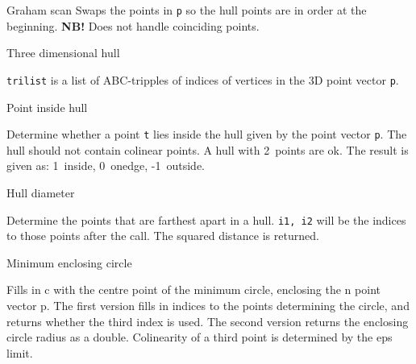 
\begin{algorithm}{Graham scan}
\desc
Swaps the points in {\tt p} so the hull points are in order at the
beginning.  {\bf NB!} Does not handle coinciding points.
\end{algorithm}


\begin{algorithm}{Three dimensional hull}


\desc
{\tt trilist} is a list of ABC-tripples of indices of vertices in the 3D
point vector {\tt p}.
\end{algorithm}


\begin{algorithm}{Point inside hull}

\desc
Determine whether a point {\tt t} lies inside the hull given by the
point vector {\tt p}. The hull should not contain colinear points. A hull with
2~points are ok. The result is given as: 1~inside, 0~onedge, -1~outside.
\end{algorithm}


\begin{algorithm}{Hull diameter}

\desc
Determine the points that are farthest apart in a hull.
{\tt i1, i2} will be the indices to those points after the call.
The squared distance is returned.
\end{algorithm}


\begin{algorithm}{Minimum enclosing circle}

\desc
Fills in c with the centre point of the minimum circle, enclosing the
n point vector p. 
The first version fills in indices to the points
determining the circle, and returns whether the third index is used.
The second version returns the enclosing circle radius as a double.
Colinearity of a third point is determined by the eps limit.
\end{algorithm}

